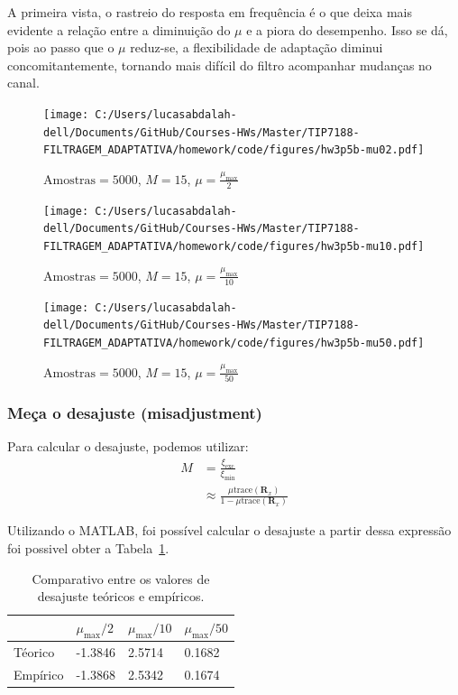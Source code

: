 A primeira vista, o rastreio do resposta em frequência é o que deixa mais evidente a relação entre a diminuição do $\mu$ e a piora do desempenho. Isso se dá, pois ao passo que o $\mu$ reduz-se, a flexibilidade de adaptação diminui concomitantemente, tornando mais difícil do filtro acompanhar mudanças no canal.

\begin{figure}[!htp]
    \centering
    \texttt{[image: C:/Users/lucasabdalah-dell/Documents/GitHub/Courses-HWs/Master/TIP7188-FILTRAGEM\_ADAPTATIVA/homework/code/figures/hw3p5b-mu02.pdf]}
    \caption{$\text{Amostras} = 5000$, $M = 15$, $\mu = \frac{\mu_{\text{max}}}{2}$}
    \label{fig:mu_2}
\end{figure}

\begin{figure}[!htp]
    \centering
    \texttt{[image: C:/Users/lucasabdalah-dell/Documents/GitHub/Courses-HWs/Master/TIP7188-FILTRAGEM\_ADAPTATIVA/homework/code/figures/hw3p5b-mu10.pdf]}
    \caption{$\text{Amostras} = 5000$, $M = 15$, $\mu = \frac{\mu_{\text{max}}}{10}$}
    \label{fig:mu_10}
\end{figure}

\begin{figure}[!htp]
    \centering
    \texttt{[image: C:/Users/lucasabdalah-dell/Documents/GitHub/Courses-HWs/Master/TIP7188-FILTRAGEM\_ADAPTATIVA/homework/code/figures/hw3p5b-mu50.pdf]}
    \caption{$\text{Amostras} = 5000$, $M = 15$, $\mu = \frac{\mu_{\text{max}}}{50}$}
    \label{fig:mu_50}
\end{figure}

\clearpage

\subsubsection*{Meça o desajuste (misadjustment)}
Para calcular o desajuste, podemos utilizar:
\begin{align*}
    M &= \frac{\xi_{\text{exc}}}{\xi_{\text{min}}} \\
    &\approx \frac{\mu \text{trace}(\mathbf{R}_{x})}{1 - \mu \text{trace}(\mathbf{R}_{x})}
\end{align*}

Utilizando o MATLAB, foi possível calcular o desajuste a partir dessa expressão foi possivel obter a Tabela~\ref{tab:desajuste}.

\begin{table}[!htp]
    \centering
    \begin{tabular}{|l|l|l|l|}
        \hline
        & $ \mu_{\text{max}}/2$ & $\mu_{\text{max}}/10$ & $\mu_{\text{max}}/50$ \\ \hline
        Téorico & -1.3846  & 2.5714 & 0.1682 \\ \hline
        Empírico & -1.3868 & 2.5342 & 0.1674 \\ \hline
    \end{tabular}
    \caption{Comparativo entre os valores de desajuste teóricos e empíricos.}
    \label{tab:desajuste}
\end{table}

